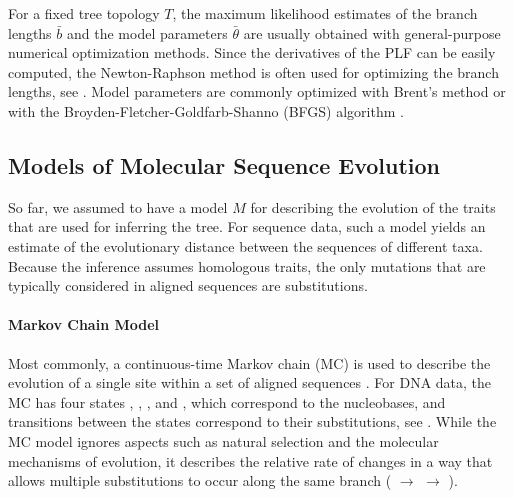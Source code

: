 For a fixed tree topology $T$, the maximum likelihood estimates
of the branch lengths $\bar{b}$ and the model parameters $\bar{\theta}$
are usually obtained with general-purpose numerical optimization methods.
Since the derivatives of the PLF can be easily computed,
the Newton-Raphson method \cite{Ypma1995} is often used for optimizing the branch lengths,
see .
Model parameters are commonly optimized with Brent's method \cite{Brent1971}
or with the Broyden-Fletcher-Goldfarb-Shanno (BFGS) algorithm \cite{Fletcher1987}.


\subsection{Models of Molecular Sequence Evolution}
\label{ch:Foundations:sec:MLTreeInference:sub:ModelsOfSeqEvol}

So far, we assumed to have a model $M$ for describing the evolution of the traits that are used for inferring the tree.
For sequence data, such a model yields an estimate of the evolutionary distance between the sequences of different taxa.
Because the inference assumes homologous traits,
the only mutations that are typically considered in aligned sequences are substitutions.

\paragraph{Markov Chain Model}
\label{ch:Foundations:sec:MLTreeInference:sub:ModelsOfSeqEvol:par:MCModel}

Most commonly, a continuous-time Markov chain (MC) is used to describe
the evolution of a single site within a set of aligned sequences \cite{Gagniuc2017}.
For DNA data, the MC has four states , , , and ,
which correspond to the nucleobases, and transitions between the states correspond to their substitutions,
see .
While the MC model ignores aspects such as natural selection and the molecular mechanisms of evolution,
it describes the relative rate of changes in a way that allows multiple substitutions to occur
along the same branch ( $\rightarrow$  $\rightarrow$ ).

